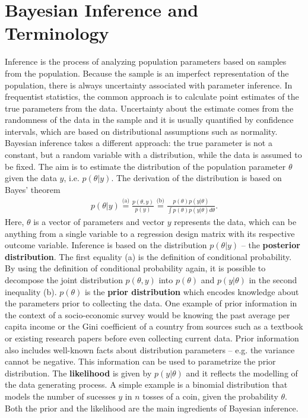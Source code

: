 \section{Bayesian Inference and Terminology}

Inference is the process of analyzing population parameters based on samples from the population. Because the sample is an imperfect representation of the population, there is always uncertainty associated with parameter inference. 
In frequentist statistics, the common approach is to calculate point estimates of the true parameters from the data. Uncertainty about the estimate comes from the randomness of the data in the sample and it is usually quantified by confidence intervals, which are based on distributional assumptions such as normality. 
Bayesian inference takes a different approach: the true parameter is not a constant, but a random variable with a distribution, while the data is assumed to be fixed. The aim is to estimate the distribution of the population parameter $\theta$ given the data $y$, i.e. $p(\theta|y)$. The derivation of the distribution is based on Bayes' theorem 
\begin{gather*}
	\displaystyle p(\theta | y) \overset {\text{(a)}}{=}  \frac {p(\theta, y)}{p(y)} \overset {\text{(b)}}{=} \frac {p(\theta) p(y|\theta)}{\int p(\theta) p(y|\theta)d\theta}.
\end{gather*} 
Here, $\theta$ is a vector of parameters and vector $y$ represents the data, which can be anything from a single variable to a regression design matrix with its respective outcome variable. Inference is based on the distribution $p(\theta | y )$ – the \textbf{posterior distribution}. The first equality (a) is the definition of conditional probability. By using the definition of conditional probability again, it is possible to decompose the joint distribution $p(\theta, y)$ into $p(\theta)$ and $p(y|\theta)$ in the second inequality (b). $p(\theta)$ is the \textbf{prior distribution} which encodes knowledge about the parameters prior to collecting the data. One example of prior information in the context of a socio-economic survey would be knowing the past average per capita income or the Gini coefficient of a country from sources such as a textbook or existing research papers before even collecting current data. Prior information also includes well-known facts about distribution parameters – e.g. the variance cannot be negative. This information can be used to parametrize the prior distribution. The \textbf{likelihood} is given by $p(y | \theta)$ and it reflects the modelling of the data generating process. A simple example is a binomial distribution that models the number of sucesses $y$ in $n$ tosses of a coin, given the probability $\theta$. Both the prior and the likelihood are the main ingredients of Bayesian inference.

